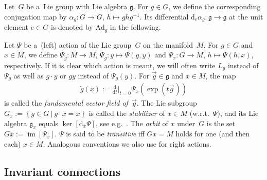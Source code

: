 \documentclass[11pt]{article}
\numberwithin{equation}{section}
\newcommand{\dttB}[2]{{\textstyle\frac{\mathrm{d}}{\mathrm{d}#1}}\big|_{#1=#2}}
\newcommand{\Co}[1]{\alpha_{#1}}
\newcommand{\wt}[1]{\widetilde{#1}}
\newcommand{\Add}[1]{\mathrm{Ad}_{#1}}
\begin{document}
Let~$G$ be a~Lie group with Lie algebra $\mathfrak{g}$.
For $g\in G$, we def\/ine the corresponding conjugation map by $\Co{g}\colon G\rightarrow G$, $h\mapsto g h g^{-1}$.
Its dif\/ferential $\mathrm{d}_e\Co{g}\colon \mathfrak{g}\rightarrow \mathfrak{g}$ at the unit element $e\in G$ is denoted
by $\Add{g}$ in the following.

Let $\Psi$ be a~(left) action of the Lie group~$G$ on the manifold~$M$.
For $g\in G$ and $x\in M$, we define $\Psi_g\colon M\rightarrow M$, $\Psi_g\colon y\mapsto \Psi(g,y)$ and $\Psi_x\colon G\rightarrow M$, $h\mapsto\Psi(h,x)$, respectively. If it is clear which action is meant, we will often write $L_g$ instead of $\Psi_g$ as well as $g\cdot y$ or $g y$ instead of $\Psi_g(y)$. For $\vec{g}\in \mathfrak{g}$ and $x\in M$, the map
\begin{gather*}
\wt{g}(x):=\dttB{t}{0} \Psi_x(\exp(t\vec{g}\hspace{1pt}))
\end{gather*}
is called the
\emph{fundamental vector field of~$\vec{g}$}.
The Lie subgroup $G_x:=\left\{g\in G\: \big| \: g\cdot x=x\right\}$ is called the \emph{stabilizer} of $x\in M$
(w.r.t.~$\Psi$), and its Lie algebra $\mathfrak{g}_x$ equals $\ker[\mathrm{d}_x\Psi]$, see e.g.~\cite{DuisKolk}.
The \emph{orbit} of $x$ under~$G$ is the set $Gx:=\operatorname{\mathrm{im}}[\Psi_x]$. $\Psi$ is said to be
\emph{transitive} if\/f $Gx=M$ holds for one (and then each) $x\in M$.
Analogous conventions we also use for right actions.

\subsection{Invariant connections}\label{subsec:InvConn}
\end{document}
